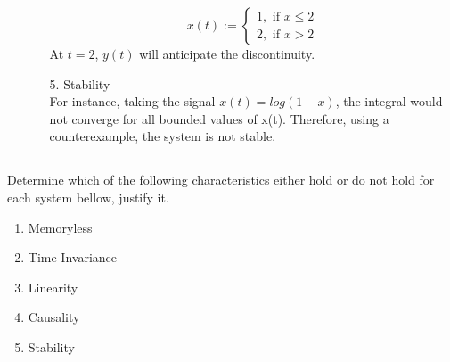 \documentclass{article}
\begin{document}
\begin{enumerate}
\begin{enumerate}
                \begin{equation*}
                x(t) := \left\{\begin{array}{cc}
                 1,\textrm{ if }x \leq 2  \\
                 2,\textrm{ if }x > 2 
                \end{array} \right.
                \end{equation*}
                At $t=2$, $y(t)$ will anticipate the discontinuity.
            \item[5.] Stability \\
                For instance, taking the signal $x(t) = log(1-x)$, the integral would not converge for all bounded values of x(t). Therefore, using a counterexample, the system is not stable.
        \end{enumerate}
\end{enumerate}
\subsection{} Determine which of the following characteristics either hold or do not hold for each system bellow, justify it.
\begin{enumerate}
    \item Memoryless
    \item Time Invariance
    \item Linearity
    \item Causality
    \item Stability
\end{enumerate}
\end{document}
